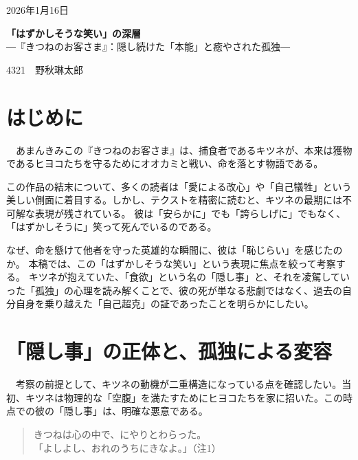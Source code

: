\documentclass[a4paper,11pt]{ltjsarticle}
\begin{document}
\begin{flushright}
2026年1月16日
\end{flushright}
\vspace{-1.5em}

\begin{center}
    {\Large \textbf{「はずかしそうな笑い」の深層}} \\[0.3em]
    {\large ―『きつねのお客さま』：隠し続けた「本能」と癒やされた孤独―}
\end{center}

\vspace{-0.5em}

\begin{flushright}
 4321　野秋琳太郎
\end{flushright}

\vspace{1.0em} 

\section{はじめに}
　あまんきみこの『きつねのお客さま』は、捕食者であるキツネが、本来は獲物であるヒヨコたちを守るためにオオカミと戦い、命を落とす物語である。

この作品の結末について、多くの読者は「愛による改心」や「自己犠牲」という美しい側面に着目する\cite{miyagawa, yoshimura}。しかし、テクストを精密に読むと、キツネの最期には不可解な表現が残されている。
彼は「安らかに」でも「誇らしげに」でもなく、「はずかしそうに」笑って死んでいるのである。

なぜ、命を懸けて他者を守った英雄的な瞬間に、彼は「恥じらい」を感じたのか。
本稿では、この「はずかしそうな笑い」という表現に焦点を絞って考察する。
キツネが抱えていた、「食欲」という名の「隠し事」と、それを凌駕していった「孤独」の心理を読み解くことで、彼の死が単なる悲劇ではなく、過去の自分自身を乗り越えた「自己超克」の証であったことを明らかにしたい。

\section{「隠し事」の正体と、孤独による変容}
　考察の前提として、キツネの動機が二重構造になっている点を確認したい。当初、キツネは物理的な「空腹」を満たすためにヒヨコたちを家に招いた。この時点での彼の「隠し事」は、明確な悪意である。

\begin{quote}
きつねは心の中で、にやりとわらった。\\
「よしよし、おれのうちにきなよ。」（注1）
\end{quote}
\end{document}
